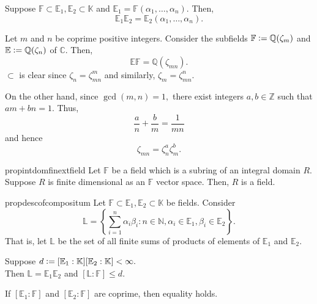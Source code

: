 \begin{ex}
    Suppose $\mathbb{F} \subset \mathbb{E}_1, \mathbb{E}_2 \subset \mathbb{K}$ and $\mathbb{E}_1 = \mathbb{F}(\alpha_1, \ldots, \alpha_n).$ Then,
    \begin{equation*} 
        \mathbb{E}_1\mathbb{E}_2 = \mathbb{E}_2(\alpha_1, \ldots, \alpha_n).
    \end{equation*}
\end{ex}

\begin{ex} \label{ex:compositecyclo}
    Let $m$ and $n$ be coprime positive integers. Consider the subfields $\mathbb{F} \vcentcolon= \mathbb{Q}(\zeta_m)$ and $\mathbb{E} \vcentcolon= \mathbb{Q}(\zeta_n)$ of $\mathbb{C}.$ Then,
    \begin{equation*} 
        \mathbb{E}\mathbb{F} = \mathbb{Q}(\zeta_{mn}).
    \end{equation*}
    $\subset$ is clear since $\zeta_n = \zeta_{mn}^m$ and similarly, $\zeta_m = \zeta_{mn}^n.$

    On the other hand, since $\gcd(m, n) = 1,$ there exist integers $a, b \in \mathbb{Z}$ such that $am + bn = 1.$ Thus,
    \begin{equation*} 
        \frac{a}{n} + \frac{b}{m} = \frac{1}{mn}
    \end{equation*}
    and hence
    \begin{equation*} 
        \zeta_{mn} = \zeta_n^a\zeta_m^b.
    \end{equation*}
\end{ex}

\begin{restatable}[]{prop}{intdomfinextfield}
\label{prop:intdomfinextfield}
    Let $\mathbb{F}$ be a field which is a subring of an integral domain $R.$ Suppose $R$ is finite dimensional as an $\mathbb{F}$ vector space. Then, $R$ is a field. \hfill\hyperref[prop:intdomfinextfield2]{\downsym}
\end{restatable}

\begin{restatable}[]{prop}{descofcompositum}
\label{prop:descofcompositum}
    Let $\mathbb{F} \subset \mathbb{E}_1, \mathbb{E}_2 \subset \mathbb{K}$ be fields. Consider
    \begin{equation*} 
        \mathbb{L} = \left\{\sum_{i = 1}^{n} \alpha_i\beta_i : n \in \mathbb{N}, \alpha_i \in \mathbb{E}_1, \beta_i \in \mathbb{E}_2\right\}.
    \end{equation*}
    That is, let $\mathbb{L}$ be the set of all finite sums of products of elements of $\mathbb{E}_1$ and $\mathbb{E}_2.$

    Suppose $d \vcentcolon= [\mathbb{E}_1 : \mathbb{K}][\mathbb{E}_2 : \mathbb{K}] < \infty.$ \\
    Then $\mathbb{L} = \mathbb{E}_1\mathbb{E}_2$ and $[\mathbb{L} : \mathbb{F}] \le d.$ 

     If $[\mathbb{E}_1 : \mathbb{F}]$ and $[\mathbb{E}_2 : \mathbb{F}]$ are coprime, then equality holds. \hfill\hyperref[prop:descofcompositum2]{\downsym}
\end{restatable}

